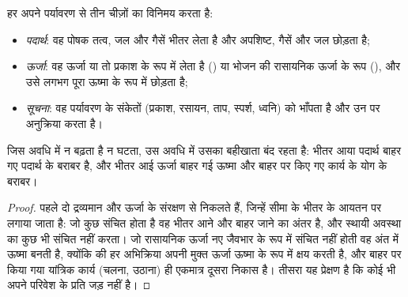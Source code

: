 \begin{proposition}[तीन विनिमय]\label{prop:b1:organism-environment:exchanges}
हर  अपने पर्यावरण से तीन चीज़ों का विनिमय करता है:
\begin{itemize}
  \item \emph{पदार्थ}: वह पोषक तत्व, जल और गैसें
        भीतर लेता है और अपशिष्ट, गैसें और जल छोड़ता है;
  \item \emph{ऊर्जा}: वह ऊर्जा या तो प्रकाश के रूप
        में लेता है () या भोजन की रासायनिक ऊर्जा के रूप
        (), और उसे लगभग पूरा ऊष्मा के रूप में छोड़ता है;
  \item \emph{सूचना}: वह पर्यावरण के संकेतों
        (प्रकाश, रसायन, ताप, स्पर्श, ध्वनि) को भाँपता है और उन पर
        अनुक्रिया करता है।
\end{itemize}
जिस अवधि में  न बढ़ता है न घटता, उस अवधि में उसका बहीखाता बंद रहता है:
भीतर आया पदार्थ बाहर गए पदार्थ के बराबर है, और भीतर आई ऊर्जा बाहर गई
ऊष्मा और बाहर पर किए गए कार्य के योग के बराबर।
\end{proposition}
\begin{proof}
पहले दो द्रव्यमान और ऊर्जा के संरक्षण से निकलते हैं, जिन्हें सीमा के भीतर
के आयतन पर लगाया जाता है: जो कुछ संचित होता है वह भीतर आने और बाहर जाने
का अंतर है, और स्थायी अवस्था का  कुछ भी संचित नहीं करता। जो रासायनिक
ऊर्जा नए जैवभार के रूप में संचित नहीं होती वह अंत में ऊष्मा बनती है,
क्योंकि  की हर अभिक्रिया अपनी मुक्त ऊर्जा ऊष्मा के रूप में क्षय करती
है, और बाहर पर किया गया यांत्रिक कार्य (चलना, उठाना) ही एकमात्र दूसरा
निकास है। तीसरा यह प्रेक्षण है कि कोई भी  अपने परिवेश के प्रति जड़
नहीं है।
\end{proof}


